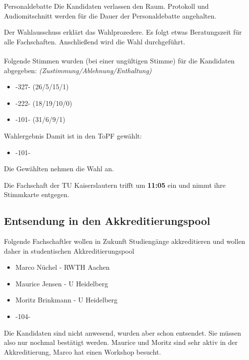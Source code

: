     \begin{info}{Personaldebatte}
      Die Kandidaten verlassen den Raum. Protokoll und Audiomitschnitt werden für die Dauer der Personaldebatte angehalten.
    \end{info}

    Der Wahlausschuss erklärt das Wahlprozedere.
    Es folgt etwas Beratungszeit für alle Fachschaften. Anschließend wird die Wahl durchgeführt. \\ \\

    Folgende Stimmen wurden (bei einer ungültigen Stimme) für die Kandidaten abgegeben: \textit{(Zustimmung/Ablehnung/Enthaltung)}
    \begin{itemize}
      \item -327- (26/5/15/1)
      \item -222- (18/19/10/0)
      \item -101- (31/6/9/1)
    \end{itemize}

    \begin{success}{Wahlergebnis}
      Damit ist in den ToPF gewählt:
      \begin{itemize}
        \item -101-
      \end{itemize}
      \tcblower
      Die Gewählten nehmen die Wahl an.
    \end{success}

    \begin{info}{}
      Die Fachschaft der TU Kaiserslautern trifft um \textbf{11:05} ein und nimmt ihre Stimmkarte entgegen.
    \end{info}

  \subsection{Entsendung in den Akkreditierungspool}
    Folgende Fachschaftler wollen in Zukunft Studiengänge akkreditieren und wollen daher in studentischen Akkreditierungspool
    \begin{itemize}
      \item Marco Nüchel - RWTH Aachen
      \item Maurice Jensen - U Heidelberg
      \item Moritz Brinkmann - U Heidelberg
      \item -104-
    \end{itemize}
    Die Kandidaten sind nicht anwesend, wurden aber schon entsendet. Sie müssen also nur nochmal bestätigt werden. Maurice und Moritz sind sehr aktiv in der Akkreditierung, Marco hat einen Workshop besucht. \\

